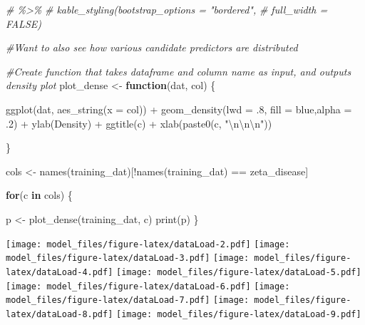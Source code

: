 \documentclass[
]{article}
\newenvironment{Shaded}{\begin{snugshade}}{\end{snugshade}}
\newcommand{\AttributeTok}[1]{\textcolor[rgb]{0.77,0.63,0.00}{#1}}
\newcommand{\CommentTok}[1]{\textcolor[rgb]{0.56,0.35,0.01}{\textit{#1}}}
\newcommand{\ControlFlowTok}[1]{\textcolor[rgb]{0.13,0.29,0.53}{\textbf{#1}}}
\newcommand{\DecValTok}[1]{\textcolor[rgb]{0.00,0.00,0.81}{#1}}
\newcommand{\FunctionTok}[1]{\textcolor[rgb]{0.00,0.00,0.00}{#1}}
\newcommand{\NormalTok}[1]{#1}
\newcommand{\OtherTok}[1]{\textcolor[rgb]{0.56,0.35,0.01}{#1}}
\newcommand{\SpecialCharTok}[1]{\textcolor[rgb]{0.00,0.00,0.00}{#1}}
\newcommand{\StringTok}[1]{\textcolor[rgb]{0.31,0.60,0.02}{#1}}
\begin{document}
\begin{Shaded}
\begin{Highlighting}[]
\CommentTok{\# \%\textgreater{}\%}
\CommentTok{\#   kable\_styling(bootstrap\_options = "bordered",}
\CommentTok{\#                 full\_width = FALSE)}

\CommentTok{\#Want to also see how various candidate predictors are distributed}

\CommentTok{\#Create function that takes dataframe and column name as input, and outputs density plot}
\NormalTok{plot\_dense }\OtherTok{\textless{}{-}} \ControlFlowTok{function}\NormalTok{(dat, col) \{}
  
  \FunctionTok{ggplot}\NormalTok{(dat, }\FunctionTok{aes\_string}\NormalTok{(}\AttributeTok{x =}\NormalTok{ col)) }\SpecialCharTok{+} 
    \FunctionTok{geom\_density}\NormalTok{(}\AttributeTok{lwd =}\NormalTok{ .}\DecValTok{8}\NormalTok{, }\AttributeTok{fill =} \StringTok{\textquotesingle{}blue\textquotesingle{}}\NormalTok{,}\AttributeTok{alpha =}\NormalTok{ .}\DecValTok{2}\NormalTok{) }\SpecialCharTok{+}
    \FunctionTok{ylab}\NormalTok{(}\StringTok{\textquotesingle{}Density\textquotesingle{}}\NormalTok{) }\SpecialCharTok{+}
    \FunctionTok{ggtitle}\NormalTok{(c) }\SpecialCharTok{+}
    \FunctionTok{xlab}\NormalTok{(}\FunctionTok{paste0}\NormalTok{(c, }\StringTok{"}\SpecialCharTok{\textbackslash{}n\textbackslash{}n\textbackslash{}n}\StringTok{"}\NormalTok{))}
  
  
\NormalTok{\}}

\NormalTok{cols }\OtherTok{\textless{}{-}} \FunctionTok{names}\NormalTok{(training\_dat)[}\SpecialCharTok{!}\FunctionTok{names}\NormalTok{(training\_dat) }\SpecialCharTok{==} \StringTok{\textquotesingle{}zeta\_disease\textquotesingle{}}\NormalTok{]}

\ControlFlowTok{for}\NormalTok{(c }\ControlFlowTok{in}\NormalTok{ cols) \{}
  
\NormalTok{  p }\OtherTok{\textless{}{-}} \FunctionTok{plot\_dense}\NormalTok{(training\_dat, c)}
  \FunctionTok{print}\NormalTok{(p)}
\NormalTok{\}}
\end{Highlighting}
\end{Shaded}

\texttt{[image: model\_files/figure-latex/dataLoad-2.pdf]}
\texttt{[image: model\_files/figure-latex/dataLoad-3.pdf]}
\texttt{[image: model\_files/figure-latex/dataLoad-4.pdf]}
\texttt{[image: model\_files/figure-latex/dataLoad-5.pdf]}
\texttt{[image: model\_files/figure-latex/dataLoad-6.pdf]}
\texttt{[image: model\_files/figure-latex/dataLoad-7.pdf]}
\texttt{[image: model\_files/figure-latex/dataLoad-8.pdf]}
\texttt{[image: model\_files/figure-latex/dataLoad-9.pdf]}
\end{document}
